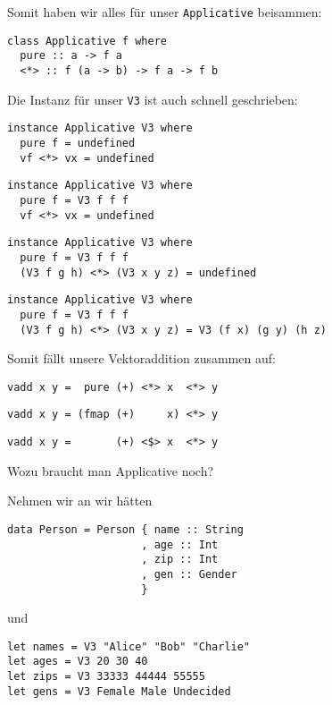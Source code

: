 \documentclass{beamer}
\begin{document}
\begin{frame}[fragile]
Somit haben wir alles für unser \texttt{Applicative} beisammen:
\begin{verbatim}
class Applicative f where
  pure :: a -> f a
  <*> :: f (a -> b) -> f a -> f b
\end{verbatim}
\pause
Die Instanz für unser \texttt{V3} ist auch schnell geschrieben:
\begin{overprint}
\begin{verbatim}
instance Applicative V3 where
  pure f = undefined
  vf <*> vx = undefined
\end{verbatim}
\begin{verbatim}
instance Applicative V3 where
  pure f = V3 f f f
  vf <*> vx = undefined
\end{verbatim}
\begin{verbatim}
instance Applicative V3 where
  pure f = V3 f f f
  (V3 f g h) <*> (V3 x y z) = undefined
\end{verbatim}
\begin{verbatim}
instance Applicative V3 where
  pure f = V3 f f f
  (V3 f g h) <*> (V3 x y z) = V3 (f x) (g y) (h z)
\end{verbatim}
\end{overprint}
\pause
\pause
\pause
\pause
Somit fällt unsere Vektoraddition zusammen auf:
\begin{overprint}
\begin{verbatim}
vadd x y =  pure (+) <*> x  <*> y
\end{verbatim}
\begin{verbatim}
vadd x y = (fmap (+)     x) <*> y
\end{verbatim}
\begin{verbatim}
vadd x y =       (+) <$> x  <*> y
\end{verbatim}
\end{overprint}
\end{frame}


\begin{frame}[fragile]
Wozu braucht man Applicative noch?\\\par \pause
Nehmen wir an wir hätten
\begin{verbatim}
data Person = Person { name :: String
                     , age :: Int
                     , zip :: Int
                     , gen :: Gender
                     }
\end{verbatim}
\pause
und
\begin{verbatim}
let names = V3 "Alice" "Bob" "Charlie"
let ages = V3 20 30 40
let zips = V3 33333 44444 55555
let gens = V3 Female Male Undecided
\end{verbatim}
\end{frame}
\end{document}
